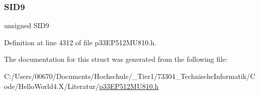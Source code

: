 \subsubsection{\texorpdfstring{S\+I\+D9}{SID9}}
{\footnotesize\ttfamily unsigned S\+I\+D9}



Definition at line 4312 of file p33\+E\+P512\+M\+U810.\+h.



The documentation for this struct was generated from the following file\+:\begin{DoxyCompactItemize}
\item 
C\+:/\+Users/00670/\+Documents/\+Hochschule/\+\_\+\+Tier1/73304\+\_\+\+Technische\+Informatik/\+Code/\+Hello\+World4.\+X/\+Literatur/\hyperlink{p33_e_p512_m_u810_8h}{p33\+E\+P512\+M\+U810.\+h}\end{DoxyCompactItemize}
